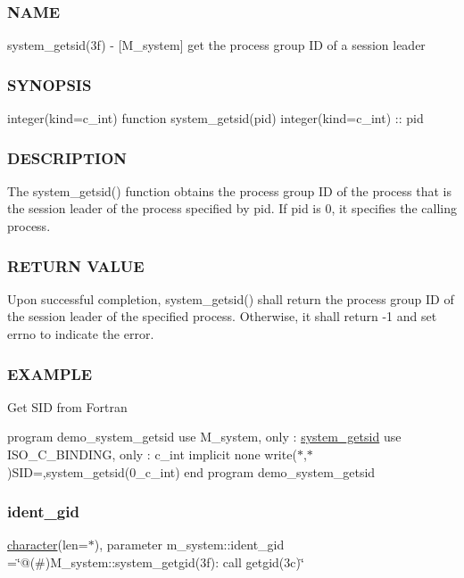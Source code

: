 \subsubsection*{N\+A\+ME}

system\+\_\+getsid(3f) -\/ \mbox{[}M\+\_\+system\mbox{]} get the process group ID of a session leader \subsubsection*{S\+Y\+N\+O\+P\+S\+IS}

integer(kind=c\+\_\+int) function system\+\_\+getsid(pid) integer(kind=c\+\_\+int) \+:\+: pid \subsubsection*{D\+E\+S\+C\+R\+I\+P\+T\+I\+ON}

The system\+\_\+getsid() function obtains the process group ID of the process that is the session leader of the process specified by pid. If pid is 0, it specifies the calling process. \subsubsection*{R\+E\+T\+U\+RN V\+A\+L\+UE}

Upon successful completion, system\+\_\+getsid() shall return the process group ID of the session leader of the specified process. Otherwise, it shall return -\/1 and set errno to indicate the error. \subsubsection*{E\+X\+A\+M\+P\+LE}

Get S\+ID from Fortran

program demo\+\_\+system\+\_\+getsid use M\+\_\+system, only \+: \hyperlink{interfacem__system_1_1system__getsid}{system\+\_\+getsid} use I\+S\+O\+\_\+\+C\+\_\+\+B\+I\+N\+D\+I\+NG, only \+: c\+\_\+int implicit none write($\ast$,$\ast$)\textquotesingle{}S\+ID=\textquotesingle{},system\+\_\+getsid(0\+\_\+c\+\_\+int) end program demo\+\_\+system\+\_\+getsid \mbox{\label{namespacem__system_aef12712abc21ae9a60c24a59dc6dcb8c}} 
\subsubsection{\texorpdfstring{ident\+\_\+gid}{ident\_gid}}
{\footnotesize\ttfamily \hyperlink{option__stopwatch_83_8txt_abd4b21fbbd175834027b5224bfe97e66}{character}(len=$\ast$), parameter m\+\_\+system\+::ident\+\_\+gid =\char`\"{}@(\#)M\+\_\+system\+::system\+\_\+getgid(3f)\+: call getgid(3c)\char`\"{}\hspace{0.3cm}{\ttfamily [private]}}



